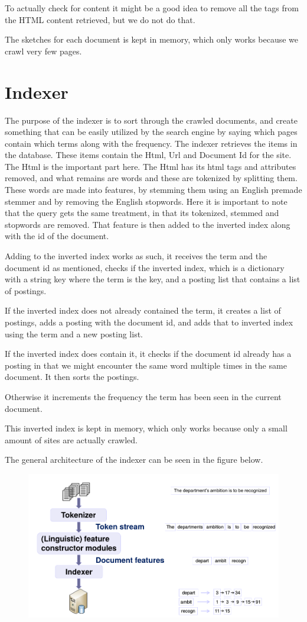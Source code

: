 	To actually check for content it might be a good idea to remove all the tags from the HTML content retrieved, but we do not do that.
	
	The sketches for each document is kept in memory, which only works because we crawl very few pages.
	
	\section{Indexer}
	The purpose of the indexer is to sort through the crawled documents, and create something that can be easily utilized by the search engine by saying which pages contain which terms along with the frequency.
	The indexer retrieves the items in the database.
	These items contain the Html, Url and Document Id for the site.
	The Html is the important part here. The Html has its html tags and attributes removed, and what remains are words and these are tokenized by splitting them. 
	These words are made into features, by stemming them using an English premade stemmer and by removing the English stopwords.
	Here it is important to note that the query gets the same treatment, in that its tokenized, stemmed and stopwords are removed.
	That feature is then added to the inverted index along with the id of the document.
	
	Adding to the inverted index works as such, it receives the term and the document id as mentioned, checks if the inverted index, which is a dictionary with a string key where the term is the key, and a posting list that contains a list of postings.
	
	If the inverted index does not already contained the term, it creates a list of postings, adds a posting with the document id, and adds that to inverted index using the term and a new posting list.
	
	If the inverted index does contain it, it checks if the document id already has a posting in that we might encounter the same word multiple times in the same document. It then sorts the postings.
	
	Otherwise it increments the frequency the term has been seen in the current document.
	
	This inverted index is kept in memory, which only works because only a small amount of sites are actually crawled.
	
	The general architecture of the indexer can be seen in the figure below.
	
	\begin{figure}[H]
	\centering
	\includegraphics[width=0.7\linewidth]{./Media/indexer}
	\caption{}
	\label{fig:indexer}
	\end{figure}
	
